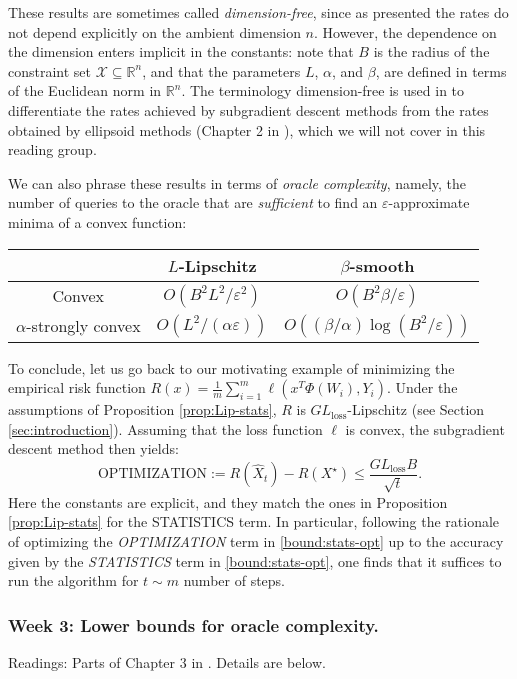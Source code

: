 These results are sometimes called \emph{dimension-free}, since as presented the rates do not depend explicitly on the ambient dimension $n$. However, the dependence on the dimension enters implicit in the constants: note that $B$ is the radius of the constraint set $\mathcal{X}\subseteq \mathbb{R}^n$, and that the parameters $L$, $\alpha$, and $\beta$, are defined in terms of the Euclidean norm in $\mathbb{R}^n$. The terminology dimension-free is used in \cite{bubeck} to differentiate the rates achieved by subgradient descent methods from the rates obtained by ellipsoid methods (Chapter 2 in \cite{bubeck}), which we will not cover in this reading group.
	
We can also phrase these results in terms of \emph{oracle complexity}, namely, the number of queries to the oracle that are \emph{sufficient} to find an $\varepsilon$-approximate minima of a convex function:
\begin{center}
 \begin{tabular}{|c | c | c|}
 \hline
 & $L$-Lipschitz & $\beta$-smooth\\
 \hline
 Convex & $O(B^2L^2/\varepsilon^2)$ & $O(B^2\beta/\varepsilon)$\\
 \hline
 $\alpha$-strongly convex & $O(L^2/(\alpha \varepsilon))$ & $O((\beta/\alpha)\log{(B^2/\varepsilon)})$\\
 \hline
\end{tabular}
\end{center}

	
\begin{remark}\label{rem:optimization}
To conclude, let us go back to our motivating example of minimizing the empirical risk function $R(x) = \frac{1}{m}\sum_{i=1}^m \ell(x^T\Phi(W_i),Y_i)$. Under the assumptions of Proposition \ref{prop:Lip-stats}, $R$ is $GL_\textrm{loss}$-Lipschitz (see Section \ref{sec:introduction}). Assuming that the loss function $\ell$ is convex, the subgradient descent method then yields:
$$
	\textrm{OPTIMIZATION} := R(\hat X_t) - R(X^\star) \le \frac{GL_\textrm{loss}B}{\sqrt{t}}.
$$
Here the constants are explicit, and they match the ones in Proposition \ref{prop:Lip-stats} for the \textrm{STATISTICS} term. In particular, following the rationale of optimizing the \emph{OPTIMIZATION} term in \eqref{bound:stats-opt} up to the accuracy given by the \emph{STATISTICS} term in \eqref{bound:stats-opt}, one finds that it suffices to run the algorithm for $t\sim m$ number of steps.
\end{remark}

\subsubsection*{Week 3: Lower bounds for oracle complexity.}
Readings: Parts of Chapter 3 in \cite{bubeck}. Details are below.\\

